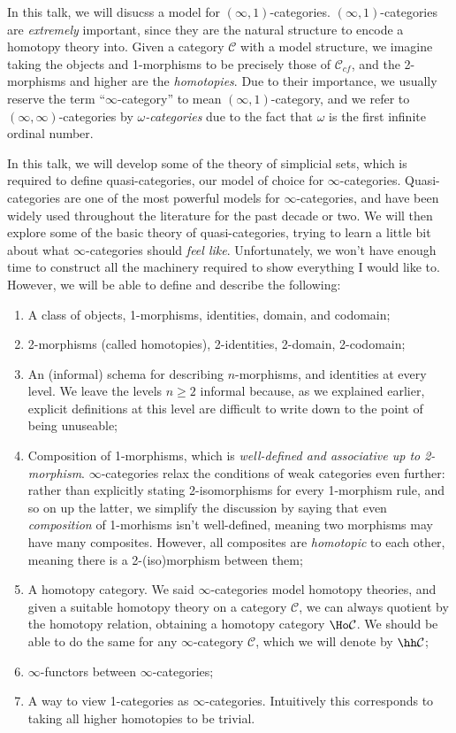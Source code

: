 In this talk, we will disucss a model for $(\infty ,1)$-categories. $(\infty ,1)$-categories are \emph{extremely} important, since they are the natural structure to encode a homotopy theory into. Given a category $\mathcal{C} $ with a model structure, we imagine taking the objects and 1-morphisms to be precisely those of $\mathcal{C}_{cf} $, and the 2-morphisms and higher are the \emph{homotopies}. Due to their importance, we usually reserve the term ``$\infty $-category'' to mean $(\infty ,1)$-category, and we refer to $(\infty ,\infty )$-categories by \emph{$\omega $-categories} due to the fact that $\omega $ is the first infinite ordinal number.

In this talk, we will develop some of the theory of simplicial sets, which is required to define quasi-categories, our model of choice for $\infty $-categories. Quasi-categories are one of the most powerful models for $\infty $-categories, and have been widely used throughout the literature for the past decade or two. We will then explore some of the basic theory of quasi-categories, trying to learn a little bit about what $\infty $-categories should \emph{feel like}. Unfortunately, we won't have enough time to construct all the machinery required to show everything I would like to. However, we will be able to define and describe the following:
\begin{enumerate}
	\item A class of objects, 1-morphisms, identities, domain, and codomain;
	\item 2-morphisms (called homotopies), 2-identities, 2-domain, 2-codomain;
	\item An (informal) schema for describing $n$-morphisms, and identities at every level. We leave the levels $n\geq 2$ informal because, as we explained earlier, explicit definitions at this level are difficult to write down to the point of being unuseable;
	\item Composition of 1-morphisms, which is \emph{well-defined and associative up to 2-morphism}. $\infty $-categories relax the conditions of weak categories even further: rather than explicitly stating 2-isomorphisms for every 1-morphism rule, and so on up the latter, we simplify the discussion by saying that even \emph{composition} of 1-morhisms isn't well-defined, meaning two morphisms may have many composites. However, all composites are \emph{homotopic} to each other, meaning there is a 2-(iso)morphism between them;
	\item A homotopy category. We said $\infty $-categories model homotopy theories, and given a suitable homotopy theory on a category $\mathcal{C} $, we can always quotient by the homotopy relation, obtaining a homotopy category $\Ho \mathcal{C} $. We should be able to do the same for any $\infty $-category $\mathcal{C} $, which we will denote by $\hh \mathcal{C} $;
	\item $\infty $-functors between $\infty $-categories;
	\item A way to view 1-categories as $\infty $-categories. Intuitively this corresponds to taking all higher homotopies to be trivial.
\end{enumerate}

